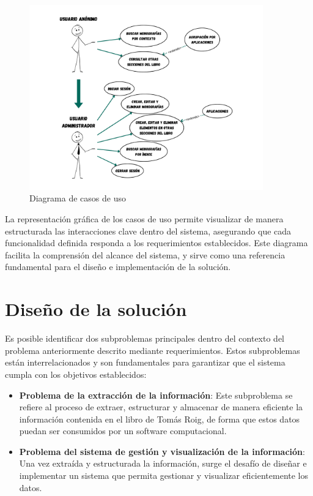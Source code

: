 \begin{figure}[ht!]
    \centering
    \includegraphics[width=0.9\textwidth]{Images/use-cases.png}
    \caption{Diagrama de casos de uso}
    \label{fig:use-cases}
\end{figure}

La representación gráfica de los casos de uso permite visualizar de manera estructurada las interacciones 
clave dentro del sistema, asegurando que cada funcionalidad definida responda a los requerimientos establecidos. 
Este diagrama facilita la comprensión del alcance del sistema, y sirve como una referencia fundamental para el diseño 
e implementación de la solución.



\section{Diseño de la solución}
Es posible identificar dos subproblemas principales dentro del contexto del problema anteriormente descrito mediante requerimientos. 
Estos subproblemas están interrelacionados y son fundamentales para garantizar que el sistema cumpla 
con los objetivos establecidos:

\begin{itemize}
    \item \textbf{Problema de la extracción de la información}: Este subproblema se refiere al proceso 
    de extraer, estructurar y almacenar de manera eficiente la información contenida en el libro de Tomás Roig, 
    de forma que estos datos puedan ser consumidos por un software computacional.
    \item \textbf{Problema del sistema de gestión y visualización de la información}: Una vez 
    extraída y estructurada la información, surge el desafío de diseñar e implementar un sistema que permita 
    gestionar y visualizar eficientemente los datos.
\end{itemize}

